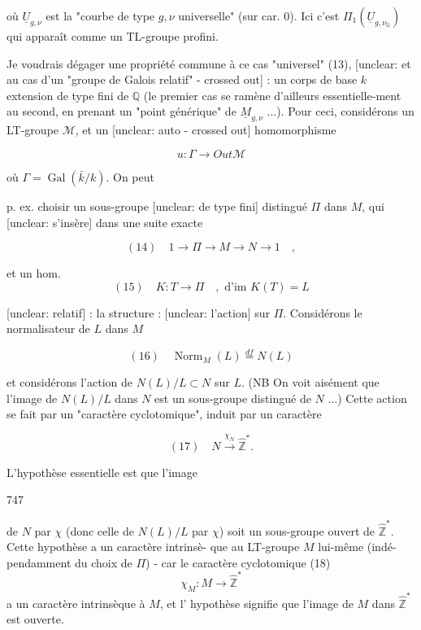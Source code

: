 où $\underline{U}_{g,\nu}$ est la "courbe de type $g,\nu$ universelle" (sur car. $0$). Ici c'est $\Pi_1(\underline{U}_{g,\nu_\mathbb{Q}})$ qui apparaît comme un TL-groupe profini.

Je voudrais dégager une propriété commune à ce cas "universel" (13), [unclear: et au cas d'un "groupe de Galois relatif" - crossed out] : un corps de base $k$ extension de type fini de $\mathbb{Q}$ (le premier cas se ramène d'ailleurs essentielle-ment au second, en prenant un "point générique" de $\underline{M}_{g,\nu}$ ...). Pour ceci, considérons un LT-groupe $\mathcal{M}$, et un [unclear: auto - crossed out] homomorphisme

$$u : \Gamma \longrightarrow Out \mathcal{M}$$

où $\Gamma = \operatorname{Gal}(\bar{k}/k)$. On peut

\newpage


p. ex. choisir un sous-groupe [unclear: de type fini]
distingué $\Pi$ dans $M$, qui [unclear: s'insère] dans
une suite exacte

$$(14) \quad 1 \to \Pi \to M \to N \to 1 \quad ,$$

et un hom.
$$(15) \quad K : T \to \Pi \quad , \text{ d'im } K(T) = L$$

[unclear: relatif] : la structure : [unclear: l'action] sur $\Pi$.
Considérons le normalisateur de
$L$ dans $M$

$$(16) \quad \operatorname{Norm}_M(L) \overset{df}{=} N(L)$$

et considérons l'action de $N(L)/L \subset N$
sur $L$. (NB On voit aisément
que l'image de $N(L)/L$ dans $N$ est
un sous-groupe distingué de $N$ ...) Cette
action se fait par un "caractère
cyclotomique", induit par un
caractère

$$(17) \quad N \xrightarrow{\chi_N} \hat{\mathbb{Z}}^* .$$

L'hypothèse essentielle est que l'image

\newpage


747

de $N$ par $\chi$ (donc celle de $N(L)/L$ par
$\chi$) soit un sous-groupe ouvert de $\hat{\mathbb{Z}}^*$.
Cette hypothèse a un caractère intrinsè-
que au LT-groupe $M$ lui-même (indé-
pendamment du choix de $\Pi$) -
car le caractère cyclotomique
(18) $$ \chi_M : M \to \hat{\mathbb{Z}}^* $$
a un caractère intrinsèque à $M$, et l'
hypothèse signifie que l'image de $M$
dans $\hat{\mathbb{Z}}^*$ est ouverte.

